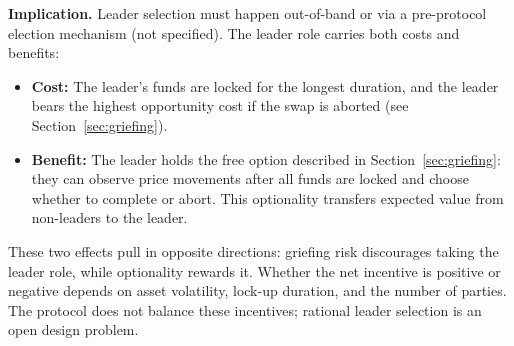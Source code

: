 \documentclass[11pt,a4paper]{article}
\begin{document}
\textbf{Implication.}\;
Leader selection must happen out-of-band or via a pre-protocol election
mechanism (not specified).
The leader role carries both costs and benefits:
\begin{itemize}
  \item \textbf{Cost:}\;
    The leader's funds are locked for the longest duration, and the leader
    bears the highest opportunity cost if the swap is aborted (see
    Section~\ref{sec:griefing}).
  \item \textbf{Benefit:}\;
    The leader holds the free option described in
    Section~\ref{sec:griefing}: they can observe price movements after all
    funds are locked and choose whether to complete or abort.
    This optionality transfers expected value from non-leaders to the
    leader.
\end{itemize}
These two effects pull in opposite directions: griefing risk discourages
taking the leader role, while optionality rewards it.
Whether the net incentive is positive or negative depends on asset
volatility, lock-up duration, and the number of parties.
The protocol does not balance these incentives; rational leader selection
is an open design problem.




\end{document}
